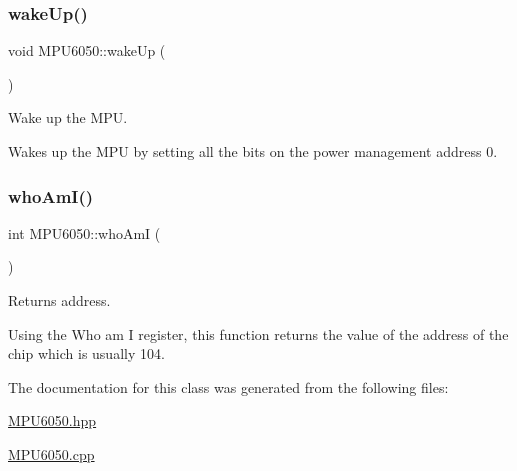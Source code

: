 \subsubsection{\texorpdfstring{wake\+Up()}{wakeUp()}}
{\footnotesize\ttfamily void M\+P\+U6050\+::wake\+Up (\begin{DoxyParamCaption}{ }\end{DoxyParamCaption})}



Wake up the M\+PU. 

Wakes up the M\+PU by setting all the bits on the power management address 0. \mbox{\label{class_m_p_u6050_a1b3f024861c18e17790ebb560d5bdd32}} 
\subsubsection{\texorpdfstring{who\+Am\+I()}{whoAmI()}}
{\footnotesize\ttfamily int M\+P\+U6050\+::who\+AmI (\begin{DoxyParamCaption}{ }\end{DoxyParamCaption})}



Returns address. 

Using the Who am I register, this function returns the value of the address of the chip which is usually 104. 

The documentation for this class was generated from the following files\+:\begin{DoxyCompactItemize}
\item 
\mbox{\hyperlink{_m_p_u6050_8hpp}{M\+P\+U6050.\+hpp}}\item 
\mbox{\hyperlink{_m_p_u6050_8cpp}{M\+P\+U6050.\+cpp}}\end{DoxyCompactItemize}
